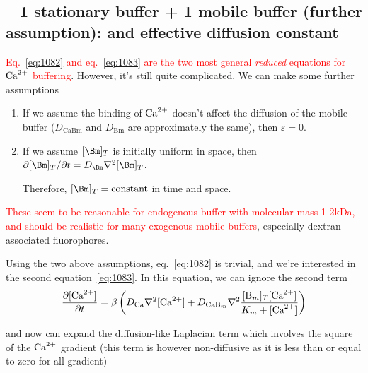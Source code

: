 \subsection{-- 1 stationary buffer + 1 mobile buffer (further assumption):  and
effective diffusion constant}
\label{sec:effective-diffusion-constant}

\textcolor{red}{Eq.~\eqref{eq:1082} and eq.~\eqref{eq:1083} are the
  two most general {\it reduced} equations for ${\text{Ca}^{2+}}$
  buffering}. However, it's still quite complicated.  We can make some further
  assumptions
  
\begin{enumerate}
\item If we assume the binding of ${\text{Ca}^{2+}}$ doesn't affect the diffusion
  of the mobile buffer ($D_\text{CaBm}$ and $D_\text{Bm}$ are approximately the
  same), then $\varepsilon = 0$.

\item If we assume $[\Bm]_T$ is initially uniform in space, then
$\partial [\Bm]_T/\partial t = D_\Bm \nabla^2[\Bm]_T$.
  
Therefore,  $[\Bm]_T=\text{constant}$ in time and space.
  
\end{enumerate}
\textcolor{red}{These seem to be reasonable for endogenous buffer with
  molecular mass 1-2kDa, and should be realistic for many exogenous
  mobile buffers}, especially dextran associated fluorophores.  
  
  Using the two above assumptions,
  eq.~\eqref{eq:1082} is trivial, and we're interested in the second
  equation~\eqref{eq:1083}.  In this equation, we can ignore the
  second term 
 \begin{equation}
  \begin{split}
    \frac{\partial [\Ca]}{\partial t} =    \beta\left(D_{\ce{Ca}}\nabla^2[\Ca] + D_{\ce{CaB_m}}\nabla^2
      \frac{[\ce{B_m}]_T[\Ca]}{K_m+[\Ca]}\right)  
  \end{split}  
\end{equation} 

and now can expand the diffusion-like Laplacian term which involves the square
of the ${\text{Ca}^{2+}}$ gradient (this term is however non-diffusive as it is less than or
equal to zero for all gradient)

